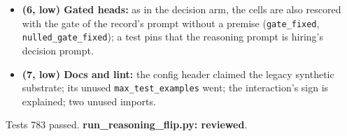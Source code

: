 \documentclass{article}
\begin{document}
\begin{itemize}
        discarded its nulled scores, and parental leave built the same direction again. Each direction is built once;
        the control is scored at baseline only.
  \item \textbf{(6, low) Gated heads:} as in the decision arm, the cells are also rescored with the gate of the
        record's prompt without a premise (\texttt{gate\_fixed}, \texttt{nulled\_gate\_fixed}); a test pins that the
        reasoning prompt is hiring's decision prompt.
  \item \textbf{(7, low) Docs and lint:} the config header claimed the legacy synthetic substrate; its unused
        \texttt{max\_test\_examples} went; the interaction's sign is explained; two unused imports.
\end{itemize}
Tests 783 passed. \textbf{run\_reasoning\_flip.py: reviewed}.
\end{document}
